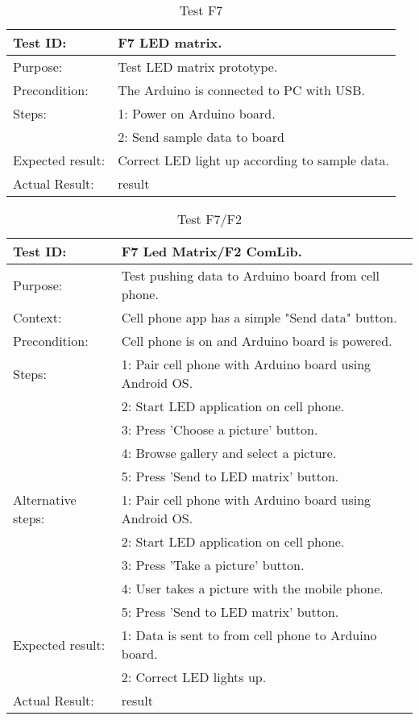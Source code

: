 \begin{table}[h!]
\begin{tabular}{|l|p{10cm}|}
\hline Test ID: & F7 LED matrix. \\ 
\hline Purpose: & Test LED matrix prototype. \\ 
\hline Precondition: & The Arduino is connected to PC with USB. \\ 
\hline
Steps:
  & 1: Power on Arduino board.\\ 
  & 2: Send sample data to board \\ 
\hline
Expected result:
  & Correct LED light up according to sample data.\\ 
\hline
Actual Result:
  & result \\
\hline
\end{tabular}
\caption{Test F7}
\label{tbl:f7test}
\end{table}

\begin{table}[h!]
\begin{tabular}{|l|p{10cm}|}
\hline Test ID: & F7 Led Matrix/F2 ComLib. \\ 
\hline Purpose: & Test pushing data to Arduino board from cell phone. \\ 
\hline Context: & Cell phone app has a simple "Send data" button. \\ 
\hline Precondition: & Cell phone is on and Arduino board is powered. \\ 
\hline
Steps:
  & 1: Pair cell phone with Arduino board using Android OS.\\ 
  & 2: Start LED application on cell phone. \\ 
  & 3: Press 'Choose a picture' button. \\
  & 4: Browse gallery and select a picture. \\
  & 5: Press 'Send to LED matrix' button. \\
\hline
Alternative steps:
  & 1: Pair cell phone with Arduino board using Android OS.\\ 
  & 2: Start LED application on cell phone. \\ 
  & 3: Press 'Take a picture' button. \\
  & 4: User takes a picture with the mobile phone. \\
  & 5: Press 'Send to LED matrix' button. \\
\hline
Expected result:
  & 1: Data is sent to from cell phone to Arduino board.\\ 
  & 2: Correct LED lights up. \\ 
\hline
Actual Result: &  result \\
\hline
\end{tabular}
\caption{Test F7/F2}
\label{tbl:f7f2test}
\end{table}

